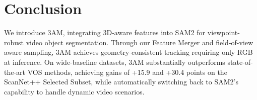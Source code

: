 \vspace{-1em}
\section{Conclusion}
\label{sec:conclusion}
\vspace{-1em}
We introduce 3AM, integrating 3D-aware features into SAM2 for viewpoint-robust video object segmentation. Through our Feature Merger and field-of-view aware sampling, 3AM achieves geometry-consistent tracking requiring only RGB at inference. On wide-baseline datasets, 3AM substantially outperforms state-of-the-art VOS methods, achieving gains of +15.9 and +30.4 points on the ScanNet++ Selected Subset, while automatically switching back to SAM2's capability to handle dynamic video scenarios.



